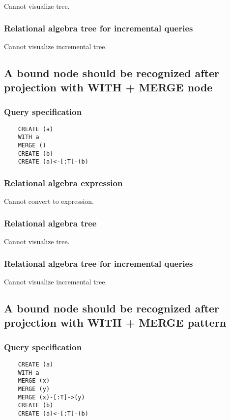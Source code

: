 	Cannot visualize tree.

	\subsubsection*{Relational algebra tree for incremental queries}

	Cannot visualize incremental tree.
	\subsection{A bound node should be recognized after projection with WITH + MERGE node}

	\subsubsection*{Query specification}

	\begin{lstlisting}
	CREATE (a)
	WITH a
	MERGE ()
	CREATE (b)
	CREATE (a)<-[:T]-(b)
	\end{lstlisting}


	\subsubsection*{Relational algebra expression}

	Cannot convert to expression.

	\subsubsection*{Relational algebra tree}

	Cannot visualize tree.

	\subsubsection*{Relational algebra tree for incremental queries}

	Cannot visualize incremental tree.
	\subsection{A bound node should be recognized after projection with WITH + MERGE pattern}

	\subsubsection*{Query specification}

	\begin{lstlisting}
	CREATE (a)
	WITH a
	MERGE (x)
	MERGE (y)
	MERGE (x)-[:T]->(y)
	CREATE (b)
	CREATE (a)<-[:T]-(b)
	\end{lstlisting}



